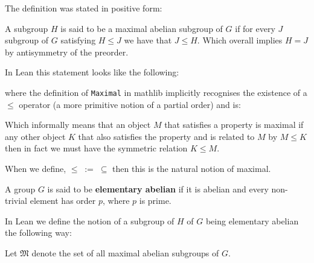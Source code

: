 \begin{remark}
The definition was stated in positive form:

A subgroup $H$ is said to be a maximal abelian subgroup of $G$ if for every $J$ subgroup of $G$ satisfying $H \le J$ we have that $J \le H$. Which overall implies $H = J$ by antisymmetry of the preorder.

In Lean this statement looks like the following:


  where the definition of \texttt{Maximal} in mathlib implicitly recognises the existence of a $\le$ operator (a more primitive notion of a partial order) and is:


  Which informally means that an object $M$ that satisfies a property is maximal if any other object $K$ that also satisfies the property and is related to $M$ by $M \le K$ then in fact we must have the symmetric relation $K \le M$.

  When we define, $\le \; := \;  \subseteq$ then this is the natural notion of maximal.
\end{remark}


\begin{definition}
\label{IsElementaryAbelian}
\leanok
A group $G$ is said to be \textbf{elementary abelian} if it is abelian and every non-trivial element has order $p$, where $p$ is prime.
\end{definition}

\begin{remark}
  In Lean we define the notion of a subgroup of $H$ of $G$ being elementary abelian the following way:
  
\end{remark}

\begin{definition}
\label{MaximalAbelianSubgroupsOf}
\leanok
Let $\mathfrak{M}$ denote the set of all maximal abelian subgroups of $G$.
\end{definition}


